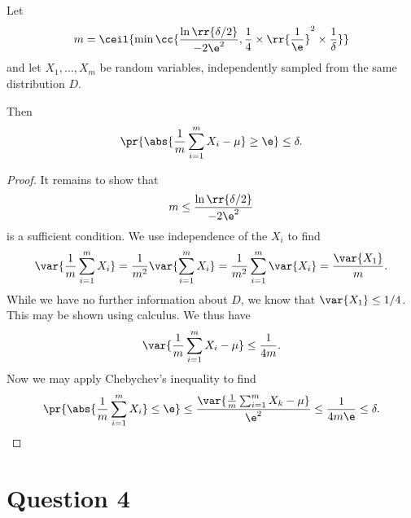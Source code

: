 \documentclass{article}
\begin{document}
\begin{claim*}
  Let
  \begin{align*}
    m = \ceil{\min\cc{\frac{\ln\rr{\delta/2}}{-2\e^2},\frac{1}{4}\times \rr{\frac{1}{\e}}^2\times \frac{1}{\delta}}}
  \end{align*}
  and let $X_1,...,X_m$ be random variables, independently sampled from the same distribution $D$.

  Then
  \begin{align*}
    \pr{\abs{\frac{1}{m}\sum_{i=1}^{m} X_i - \mu}\geq\e}\leq\delta.
  \end{align*}
  \begin{proof}
    It remains to show that
    \begin{align*}
      m\leq \frac{\ln\rr{\delta/2}}{-2\e^2}
    \end{align*}
    is a sufficient condition. We use independence of the $X_i$ to find
    \begin{align*}
      \var{\frac{1}{m}\sum_{i=1}^{m} X_i} = \frac{1}{m^2}\var{\sum_{i=1}^{m} X_i}
      = \frac{1}{m^2}\sum_{i=1}^{m} \var{X_i}
      = \frac{\var{X_1}}{m}.
    \end{align*}
    While we have no further information about $D$, we know that $\var{X_1}\leq 1/4$. This may be
    shown using calculus. We thus have
    \begin{align*}
      \var{\frac{1}{m}\sum_{i=1}^{m} X_i - \mu} \leq \frac{1}{4m}.
    \end{align*}
    Now we may apply Chebychev's inequality to find
    \begin{align*}
      \pr{\abs{\frac{1}{m}\sum_{i=1}^{m} X_i}\leq \e}
      \leq \frac{\var{\frac{1}{m}\sum_{i=1}^{m} X_k-\mu}}{\e^2} \leq \frac{1}{4m\e}\leq \delta.
    \end{align*}
  \end{proof}
\end{claim*}

\section*{Question 4}
\end{document}
